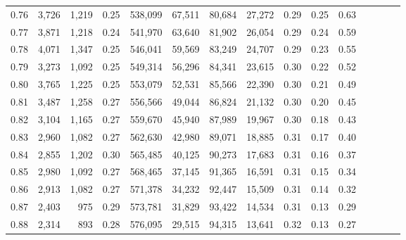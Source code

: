 \begin{tabular}{rrrcrrrrrrrrrrr}
0.76 &   3,726 &  1,219 &                                       0.25 &  538,099 &   67,511 &   80,684 &   27,272 &  0.29 &  0.25 &                         0.63 \\
0.77 &   3,871 &  1,218 &                                       0.24 &  541,970 &   63,640 &   81,902 &   26,054 &  0.29 &  0.24 &                         0.59 \\
0.78 &   4,071 &  1,347 &                                       0.25 &  546,041 &   59,569 &   83,249 &   24,707 &  0.29 &  0.23 &                         0.55 \\
0.79 &   3,273 &  1,092 &                                       0.25 &  549,314 &   56,296 &   84,341 &   23,615 &  0.30 &  0.22 &                         0.52 \\
0.80 &   3,765 &  1,225 &                                       0.25 &  553,079 &   52,531 &   85,566 &   22,390 &  0.30 &  0.21 &                         0.49 \\
0.81 &   3,487 &  1,258 &                                       0.27 &  556,566 &   49,044 &   86,824 &   21,132 &  0.30 &  0.20 &                         0.45 \\
0.82 &   3,104 &  1,165 &                                       0.27 &  559,670 &   45,940 &   87,989 &   19,967 &  0.30 &  0.18 &                         0.43 \\
0.83 &   2,960 &  1,082 &                                       0.27 &  562,630 &   42,980 &   89,071 &   18,885 &  0.31 &  0.17 &                         0.40 \\
0.84 &   2,855 &  1,202 &                                       0.30 &  565,485 &   40,125 &   90,273 &   17,683 &  0.31 &  0.16 &                         0.37 \\
0.85 &   2,980 &  1,092 &                                       0.27 &  568,465 &   37,145 &   91,365 &   16,591 &  0.31 &  0.15 &                         0.34 \\
0.86 &   2,913 &  1,082 &                                       0.27 &  571,378 &   34,232 &   92,447 &   15,509 &  0.31 &  0.14 &                         0.32 \\
0.87 &   2,403 &    975 &                                       0.29 &  573,781 &   31,829 &   93,422 &   14,534 &  0.31 &  0.13 &                         0.29 \\
0.88 &   2,314 &    893 &                                       0.28 &  576,095 &   29,515 &   94,315 &   13,641 &  0.32 &  0.13 &                         0.27 \\

\end{tabular}
